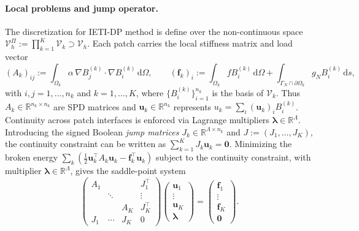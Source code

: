 \documentclass{article}
\newcommand{\vect}[1]{\boldsymbol{#1}}
\newcommand{\R}{\mathbb{R}}
\newcommand{\npatch}{K} %
\newcommand{\patchdom}[1]{\Omega_{#1}}            %
\newcommand{\Bloc}[2]{B^{(#1)}_{#2}}              %
\newcommand{\Vglo}{\mathcal{V}_h}                  %
\newcommand{\Vloc}[1]{\mathcal{V}_{#1}}            %
\newcommand{\Vprod}{\mathcal{V}_h^{\Pi}}           %
\newcommand{\Aloc}[1]{A_{#1}}                    %
\newcommand{\floc}[1]{\vect{f}_{#1}}             %
\newcommand{\Jloc}[1]{J_{#1}}                    %
\newcommand{\Jfull}{J}                            %
\newcommand{\uloc}[1]{\vect{u}_{#1}}             %
\newcommand{\lagmult}{\vect{\lambda}}             %
\theoremstyle{plain}
\numberwithin{equation}{section}
\begin{document}
\paragraph{Local problems and jump operator.}
The discretization for IETI-DP method is define over the non-continuous
space $\Vprod := \prod_{k=1}^{\npatch}
    \Vloc{k} \supset \Vglo$. Each patch carries the local stiffness matrix and load vector
\begin{equation}
    (\Aloc{k})_{ij} := \int_{\patchdom{k}} \alpha\, \nabla \Bloc{k}{j} \cdot
    \nabla \Bloc{k}{i} \,\mathrm{d}\Omega, \qquad
    (\floc{k})_{i} := \int_{\patchdom{k}} f \Bloc{k}{i} \,\mathrm{d}\Omega
    + \int_{\Gamma_N \cap \partial\patchdom{k}} g_N \Bloc{k}{i} \,\mathrm{d}s,
    \label{eq:local-stiffness}
\end{equation}
with $i, j = 1, \dots, n_k$ and $k=1, \ldots, \npatch$, where $\{\Bloc{k}{i}\}_{i=1}^{n_k}$ is the basis of
$\Vloc{k}$. Thus $\Aloc{k} \in \R^{n_k \times n_k}$ are SPD matrices
and $\uloc{k} \in \R^{n_k}$ represents $u_k = \sum_i (\uloc{k})_i \Bloc{k}{i}$.
Continuity across patch interfaces is enforced via Lagrange multipliers
$\lagmult \in \R^{\Lambda}$. Introducing the signed Boolean \emph{jump matrices}
$\Jloc{k} \in \R^{\Lambda \times n_k}$ and $\Jfull := (\Jloc{1}, \dots, \Jloc{\npatch})$,
the continuity constraint can be written as $\sum_{k=1}^{\npatch} \Jloc{k} \uloc{k} = \vect{0}$.
Minimizing the broken energy $\sum_k (\tfrac12 \uloc{k}^{\top} \Aloc{k} \uloc{k} -
    \floc{k}^{\top} \uloc{k})$ subject to the continuity constraint, with
multiplier $\lagmult \in \R^{\Lambda}$, gives the saddle-point system
\begin{equation}
    \begin{pmatrix}
        \Aloc{1} &        &                & \Jloc{1}^{\top}       \\
                 & \ddots &                & \vdots                \\
                 &        & \Aloc{\npatch} & \Jloc{\npatch}^{\top} \\
        \Jloc{1} & \cdots & \Jloc{\npatch} & 0
    \end{pmatrix}
    \begin{pmatrix}
        \uloc{1} \\ \vdots \\ \uloc{\npatch} \\ \lagmult
    \end{pmatrix}
    =
    \begin{pmatrix}
        \floc{1} \\ \vdots \\ \floc{\npatch} \\ \vect{0}
    \end{pmatrix}.
    \label{eq:ieti-saddle}
\end{equation}
\end{document}
